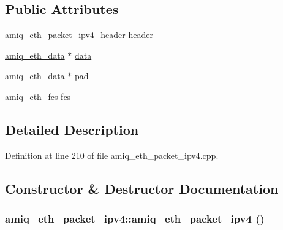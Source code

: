 \subsection*{Public Attributes}
\begin{DoxyCompactItemize}
\item 
\hyperlink{classamiq__eth__packet__ipv4__header}{amiq\_\-eth\_\-packet\_\-ipv4\_\-header} \hyperlink{classamiq__eth__packet__ipv4_af1028494effe0d4be6fd2f57088de03e}{header}
\item 
\hyperlink{amiq__eth__types_8cpp_a3595a0a508d433d383d3e5521fc0b723}{amiq\_\-eth\_\-data} $\ast$ \hyperlink{classamiq__eth__packet__ipv4_aeed97aa2e747b98e424e7333be15c736}{data}
\item 
\hyperlink{amiq__eth__types_8cpp_a3595a0a508d433d383d3e5521fc0b723}{amiq\_\-eth\_\-data} $\ast$ \hyperlink{classamiq__eth__packet__ipv4_a093b46458ac73198c5e397bb5f84c43e}{pad}
\item 
\hyperlink{amiq__eth__types_8cpp_adb511dc715b55539c6abdad1de981a9f}{amiq\_\-eth\_\-fcs} \hyperlink{classamiq__eth__packet__ipv4_aaaedb42289e1a245801096d885a714b6}{fcs}
\end{DoxyCompactItemize}


\subsection{Detailed Description}


Definition at line 210 of file amiq\_\-eth\_\-packet\_\-ipv4.cpp.

\subsection{Constructor \& Destructor Documentation}
\hypertarget{classamiq__eth__packet__ipv4_ae65fecb0be5e741a21db65015c05afa9}{
\subsubsection[{amiq\_\-eth\_\-packet\_\-ipv4}]{\setlength{\rightskip}{0pt plus 5cm}amiq\_\-eth\_\-packet\_\-ipv4::amiq\_\-eth\_\-packet\_\-ipv4 ()}}
\label{classamiq__eth__packet__ipv4_ae65fecb0be5e741a21db65015c05afa9}


